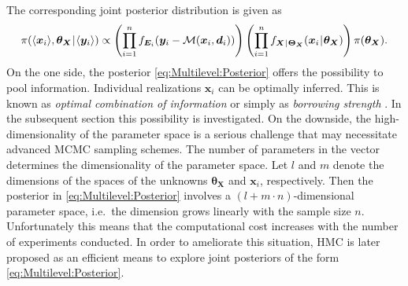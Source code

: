 The corresponding joint posterior distribution is given as
\begin{equation} \label{eq:Multilevel:Posterior}
  \pi(\langle{\bm{x}_i}\rangle,\bm{\theta}_{\bm{X}} {\:\!}|{\:\!} \langle{\bm{y}_i}\rangle) \propto
  \left( \prod\limits_{i=1}^n f_{\bm{E}_i} (\bm{y}_i-\mathcal{M}(\bm{x}_i,\bm{d}_i)) \right)
  \left( \prod\limits_{i=1}^n f_{\bm{X} {\:\!}|{\:\!} \bm{\Theta}_{\bm{X}}}(\bm{x}_i {\:\!}|{\:\!} \bm{\theta}_{\bm{X}}) \right) \pi(\bm{\theta}_{\bm{X}}).
\end{equation}
On the one side, the posterior \cref{eq:Multilevel:Posterior} offers the possibility to pool information.
Individual realizations \(\bm{x}_i\) can be optimally inferred.
This is known as \textit{optimal combination of information} or simply as \textit{borrowing strength} \cite{Multilevel:Draper1992}.
In the subsequent section this possibility is investigated.
On the downside, the high-dimensionality of the parameter space is a serious challenge that may necessitate advanced MCMC sampling schemes.
The number of parameters in the vector determines the dimensionality of the parameter space.
Let \(l\) and \(m\) denote the dimensions of the spaces of the unknowns \(\bm{\theta}_{\bm{X}}\) and \(\bm{x}_i\), respectively.
Then the posterior in \cref{eq:Multilevel:Posterior} involves a \((l + m \cdot n)\)-dimensional parameter space, i.e.\ the dimension grows linearly with the sample size \(n\).
Unfortunately this means that the computational cost increases with the number of experiments conducted.
In order to ameliorate this situation, HMC is later proposed as an efficient means to explore joint posteriors of the form \cref{eq:Multilevel:Posterior}.